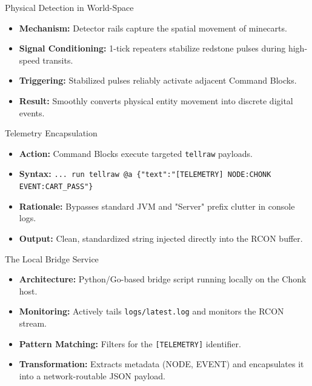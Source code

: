 \documentclass[notes]{beamer}
\begin{document}
	\begin{frame}{Physical Detection in World-Space}
		\begin{itemize}
			\item \textbf{Mechanism:} Detector rails capture the spatial movement of minecarts.
			\item \textbf{Signal Conditioning:} 1-tick repeaters stabilize redstone pulses during high-speed transits.
			\item \textbf{Triggering:} Stabilized pulses reliably activate adjacent Command Blocks.
			\item \textbf{Result:} Smoothly converts physical entity movement into discrete digital events.
		\end{itemize}
	\end{frame}

	\begin{frame}{Telemetry Encapsulation}
		\begin{itemize}
			\item \textbf{Action:} Command Blocks execute targeted \texttt{tellraw} payloads.
			\item \textbf{Syntax:} \texttt{... run tellraw @a \{"text":"[TELEMETRY] NODE:CHONK EVENT:CART\_PASS"\}}
			\item \textbf{Rationale:} Bypasses standard JVM and "Server" prefix clutter in console logs.
			\item \textbf{Output:} Clean, standardized string injected directly into the RCON buffer.
		\end{itemize}
	\end{frame}
	
	\begin{frame}{The Local Bridge Service}
		\begin{itemize}
			\item \textbf{Architecture:} Python/Go-based bridge script running locally on the Chonk host.
			\item \textbf{Monitoring:} Actively tails \texttt{logs/latest.log} and monitors the RCON stream.
			\item \textbf{Pattern Matching:} Filters for the \texttt{[TELEMETRY]} identifier.
			\item \textbf{Transformation:} Extracts metadata (NODE, EVENT) and encapsulates it into a network-routable JSON payload.
		\end{itemize}
	\end{frame}
	
\end{document}
